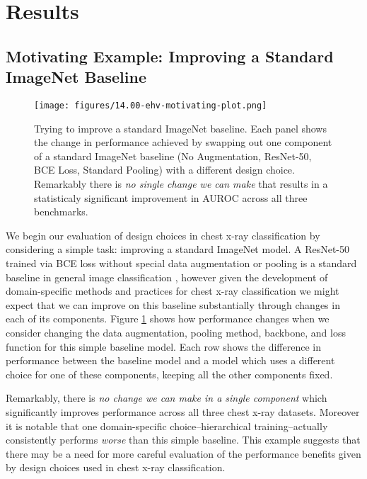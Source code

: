 \section{Results}
\subsection{Motivating Example: Improving a Standard ImageNet Baseline}
\label{subsec:imagenet-baseline}
\begin{figure}
    \centering
    \texttt{[image: figures/14.00-ehv-motivating-plot.png]}
    \caption{Trying to improve a standard ImageNet baseline. Each panel shows the change in performance achieved by swapping out one component of a standard ImageNet baseline (No Augmentation, ResNet-50, BCE Loss, Standard Pooling) with a different design choice. Remarkably there is \emph{no single change we can make} that results in a statisticaly significant improvement in AUROC across all three benchmarks. }
    \label{fig:imagenet-baseline}
\end{figure}
We begin our evaluation of design choices in chest x-ray classification by considering a simple task: improving a standard ImageNet model. A ResNet-50 trained via BCE loss without special data augmentation or pooling is a standard baseline in general image classification \citep{developers2016pytorch}, however given the development of domain-specific methods and practices for chest x-ray classification we might expect that we can improve on this baseline substantially through changes in each of its components. Figure \ref{fig:imagenet-baseline} shows how performance changes when we consider changing the data augmentation, pooling method, backbone, and loss function for this simple baseline model. Each row shows the difference in performance between the baseline model and a model which uses a different choice for one of these components, keeping all the other components fixed. 

Remarkably, there is \emph{no change we can make in a single component} which significantly improves performance across all three chest x-ray datasets. Moreover it is notable that one domain-specific choice--hierarchical training--actually consistently performs \emph{worse} than this simple baseline. This example suggests that there may be a need for more careful evaluation of the performance benefits given by design choices used in chest x-ray classification.

